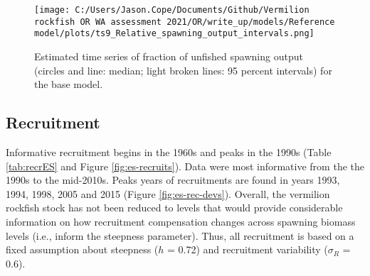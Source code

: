 \documentclass[11pt,
  english,
  a4paper,
]{article}
\begin{document}

\begin{figure}
\centering
\texttt{[image: C:/Users/Jason.Cope/Documents/Github/Vermilion rockfish OR WA assessment 2021/OR/write\_up/models/Reference model/plots/ts9\_Relative\_spawning\_output\_intervals.png]}
\caption{Estimated time series of fraction of unfished spawning output (circles and line: median; light broken lines: 95 percent intervals) for the base model.\label{fig:es-depl}}
\end{figure}

\tagmcend\tagstructend

\clearpage


\hypertarget{recruitment}{%
\subsection*{Recruitment}\label{recruitment}}

\leavevmode\tagmcend\tagstructend


Informative recruitment begins in the 1960s and peaks in the 1990s (Table \ref{tab:recrES} and Figure \ref{fig:es-recruits}). Data were most informative from the the 1990s to the mid-2010s. Peaks years of recruitments are found in years 1993, 1994, 1998, 2005 and 2015 (Figure \ref{fig:es-rec-devs}). Overall, the vermilion rockfish stock has not been reduced to levels that would provide considerable information on how recruitment compensation changes across spawning biomass levels (i.e., inform the steepness parameter). Thus, all recruitment is based on a fixed assumption about steepness ({\(h\)\leavevmode\tagmcend\tagstructend} = 0.72) and recruitment variability ({\(\sigma_R\)\leavevmode\tagmcend\tagstructend} = 0.6).

\leavevmode\tagmcend\tagstructend\par



\end{document}
